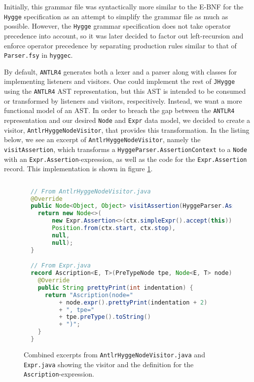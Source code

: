 Initially, this grammar file was syntactically more similar to the E-BNF for the \texttt{Hygge} specification as an attempt to
simplify the grammar file as much as possible. However, the \texttt{Hygge} grammar specification does not take operator
precedence into account, so it was later decided to factor out left-recursion and enforce operator precedence by separating
production rules similar to that of \texttt{Parser.fsy} in \texttt{hyggec}.

By default, \texttt{ANTLR4} generates both a lexer and a parser along with classes for implementing listeners and visitors.
One could implement the rest of \texttt{JHygge} using the \texttt{ANTLR4} AST representation, but this AST is intended to
be consumed or transformed by listeners and visitors, respecitively. Instead, we want a more functional model of an AST.
In order to breach the gap between the \texttt{ANTLR4} representation and our desired \texttt{Node} and \texttt{Expr} data model,
we decided to create a visitor, \texttt{AntlrHyggeNodeVisitor}, that provides this transformation. In the listing below, we
see an excerpt of \texttt{AntlrHyggeNodeVisitor}, namely the \texttt{visitAssertion}, which transforms a \texttt{HyggeParser.AssertionContext}
to a \texttt{Node} with an \texttt{Expr.Assertion}-expression, as well as the code for the \texttt{Expr.Assertion} record.
This implementation is shown in figure \ref{fig:antlr_node_visitor}.

\begin{figure}[H]
\centering 
\begin{lstlisting}[language=Java]
 
  // From AntlrHyggeNodeVisitor.java
  @Override
  public Node<Object, Object> visitAssertion(HyggeParser.AssertionContext ctx) {
    return new Node<>(
        new Expr.Assertion<>(ctx.simpleExpr().accept(this)),
        Position.from(ctx.start, ctx.stop),
        null,
        null);
  }

  // From Expr.java
  record Ascription<E, T>(PreTypeNode tpe, Node<E, T> node) implements Expr<E, T> {
    @Override
    public String prettyPrint(int indentation) {
      return "Ascription(node="
          + node.expr().prettyPrint(indentation + 2)
          + ", tpe="
          + tpe.preType().toString()
          + ")";
    }
  }

\end{lstlisting}
\caption{Combined excerpts from \texttt{AntlrHyggeNodeVisitor.java} and \texttt{Expr.java} showing the visitor and the definition for the \texttt{Ascription}-expression. }
\label{fig:antlr_node_visitor}
\end{figure}


